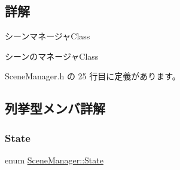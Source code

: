 \subsection{詳解}
シーンマネージャ\+Class 

シーンのマネージャ\+Class 

 Scene\+Manager.\+h の 25 行目に定義があります。



\subsection{列挙型メンバ詳解}
\mbox{\label{class_scene_manager_a68d32794fe1ce945c6a6c380c11a08eb}} 
\subsubsection{\texorpdfstring{State}{State}}
{\footnotesize\ttfamily enum \mbox{\hyperlink{class_scene_manager_a68d32794fe1ce945c6a6c380c11a08eb}{Scene\+Manager\+::\+State}}}

